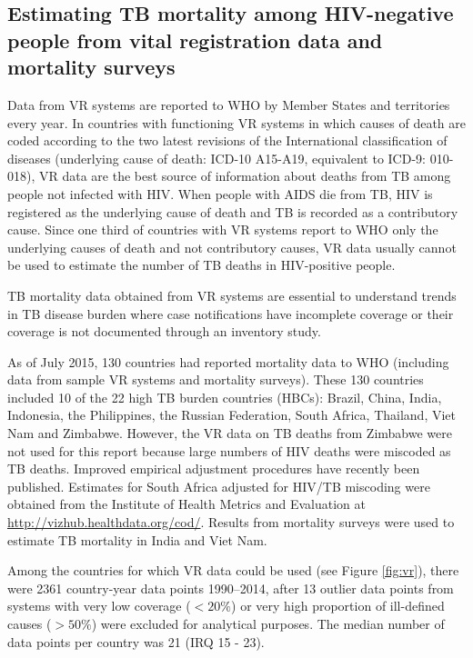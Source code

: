 \subsection{Estimating TB mortality among HIV-negative people from vital registration data and mortality surveys}

Data from VR systems are reported to WHO by Member States and territories every year. In countries with functioning VR systems in which causes of death are coded according to the two latest revisions of the International classification of diseases (underlying cause of death: ICD-10 A15-A19, equivalent to ICD-9: 010-018), VR data are the best source of information about deaths from TB among people not infected with HIV. When people with AIDS die from TB, HIV is registered as the underlying cause of death and TB is recorded as a contributory cause. Since one third of countries with VR systems report to WHO only the underlying causes of death and not contributory causes, VR data usually cannot be used to estimate the number of TB deaths in HIV-positive people. 

TB mortality data obtained from VR systems are essential to understand trends in TB disease burden where case notifications have incomplete coverage or their coverage is not documented through an inventory study. 

As of July 2015, 130 countries had reported mortality data to WHO (including data from sample VR systems and mortality surveys). These 130 countries included 10 of the 22 high TB burden countries (HBCs): Brazil, China, India, Indonesia, the Philippines, the Russian Federation, South Africa, Thailand, Viet Nam and Zimbabwe. However, the VR data on TB deaths from Zimbabwe were not used for this report because large numbers of HIV deaths were miscoded as TB deaths. Improved empirical adjustment procedures have recently been published\cite{21479092}. Estimates for South Africa adjusted for HIV/TB miscoding were obtained from the Institute of Health Metrics and Evaluation at \url{http://vizhub.healthdata.org/cod/}. Results from mortality surveys were used to estimate TB mortality in India and Viet Nam. 

Among the countries for which VR data could be used (see Figure \ref{fig:vr}), there were 2361 country-year data points 1990–2014, after 13 outlier data points from systems with very low coverage ($<20\%$) or very high proportion of ill-defined causes ($>50\%$) were excluded for analytical purposes. The median number of data points per country was 21 (IRQ 15 - 23). 

